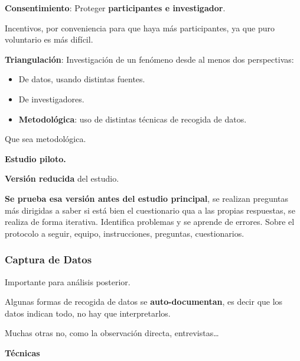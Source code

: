 \textbf{Consentimiento}: Proteger \textbf{participantes e investigador}.

Incentivos, por conveniencia para que haya más participantes, ya que
puro voluntario es más difícil.

\textbf{Triangulación}: Investigación de un fenómeno desde al menos dos
perspectivas:

\begin{itemize}
\item
  De datos, usando distintas fuentes.
\item
  De investigadores.
\item
  \textbf{Metodológica}: uso de distintas técnicas de recogida de datos.
\end{itemize}

Que sea metodológica.

\textbf{Estudio piloto.}

\textbf{Versión reducida} del estudio.

\textbf{Se prueba esa versión antes del estudio principal}, se realizan
preguntas más dirigidas a saber si está bien el cuestionario qua a las
propias respuestas, se realiza de forma iterativa. Identifica problemas
y se aprende de errores. Sobre el protocolo a seguir, equipo,
instrucciones, preguntas, cuestionarios.

\hypertarget{captura-de-datos}{%
\subsubsection{Captura de Datos}\label{captura-de-datos}}

Importante para análisis posterior.

Algunas formas de recogida de datos se \textbf{auto-documentan}, es
decir que los datos indican todo, no hay que interpretarlos.

Muchas otras no, como la observación directa, entrevistas\ldots{}

\textbf{Técnicas}

